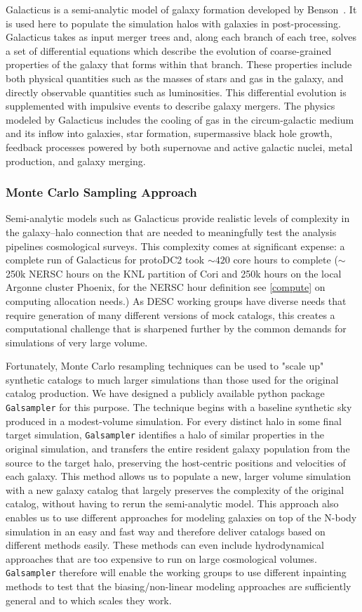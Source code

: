 \documentclass[preprint,times]{aastex61}
\begin{document}
Galacticus is a semi-analytic model of galaxy formation developed by Benson~\cite{benson}. It is used here to populate the simulation halos with galaxies in post-processing. Galacticus takes as input merger trees and, along each branch of each tree, solves a set of differential equations which describe the evolution of coarse-grained properties of the galaxy that forms within that branch. These properties include both physical quantities such as the masses of stars and gas in the galaxy, and directly observable quantities such as luminosities. This differential evolution is supplemented with impulsive events to describe galaxy mergers. The physics modeled by Galacticus includes the cooling of gas in the circum-galactic medium and its inflow into galaxies, star formation, supermassive black hole growth, feedback processes powered by both supernovae and active galactic nuclei, metal production, and galaxy merging. 

\subsubsection{Monte Carlo Sampling Approach}
Semi-analytic models such as Galacticus provide realistic levels of complexity in the galaxy--halo connection that are needed to meaningfully test the analysis pipelines cosmological surveys. This complexity comes at significant expense: a complete run of Galacticus for protoDC2 took $\sim 420$ core hours to complete ($\sim$ 250k NERSC hours on the KNL partition of Cori and 250k hours on the local Argonne cluster Phoenix, for the NERSC hour definition see \autoref{compute} on computing allocation needs.) As DESC working groups have diverse needs that require generation of many different versions of mock catalogs, this creates a computational challenge that is sharpened further by the common demands for simulations of very large volume.

Fortunately, Monte Carlo resampling techniques can be used to "scale up" synthetic catalogs to much larger simulations than those used for the original catalog production. We have designed a publicly available python package {\tt Galsampler} for this purpose. The technique begins with a baseline synthetic sky produced in a modest-volume simulation. For every distinct halo in some final target simulation, {\tt Galsampler} identifies a halo of similar properties in the original simulation, and transfers the entire resident galaxy population from the source to the target halo, preserving the host-centric positions and velocities of each galaxy. This method allows us to populate a new, larger volume simulation with a new galaxy catalog that largely preserves the complexity of the original catalog, without having to rerun the semi-analytic model. This approach also enables us to use different approaches for modeling galaxies on top of the N-body simulation in an easy and fast way and therefore deliver catalogs based on different methods easily. These methods can even include hydrodynamical approaches that are too expensive to run on large cosmological volumes. {\tt Galsampler} therefore will enable the working groups to use different inpainting methods to test that the biasing/non-linear modeling approaches are sufficiently general and to which scales they work. 
\end{document}
